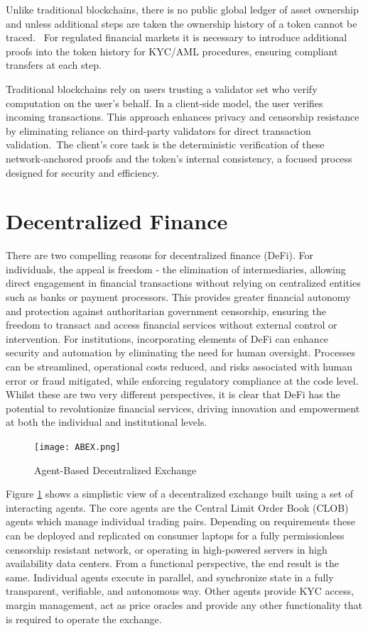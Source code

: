 \documentclass{article}
\begin{document}
Unlike traditional blockchains, there is no public global ledger of asset ownership and unless additional steps are taken the ownership history of a token cannot be traced.  For regulated financial markets it is necessary to introduce additional proofs into the token history for KYC/AML procedures, ensuring compliant transfers at each step.

Traditional blockchains rely on users trusting a validator set who verify computation on the user’s behalf. In a client-side model, the user verifies incoming transactions. This approach enhances privacy and censorship resistance by eliminating reliance on third-party validators for direct transaction validation. The client's core task is the deterministic verification of these network-anchored proofs and the token's internal consistency, a focused process designed for security and efficiency.

\section{Decentralized Finance}

There are two compelling reasons for decentralized finance (DeFi). For individuals, the appeal is freedom - the elimination of intermediaries, allowing direct engagement in financial transactions without relying on centralized entities such as banks or payment processors. This provides greater financial autonomy and protection against authoritarian government censorship, ensuring the freedom to transact and access financial services without external control or intervention. For institutions, incorporating elements of DeFi can enhance security and automation by eliminating the need for human oversight. Processes can be streamlined, operational costs reduced, and risks associated with human error or fraud mitigated, while enforcing regulatory compliance at the code level. Whilst these are two very different perspectives, it is clear that DeFi has the potential to revolutionize financial services, driving innovation and empowerment at both the individual and institutional levels.



\begin{figure}[H]
    \centering
    \texttt{[image: ABEX.png]}
    \caption{Agent-Based Decentralized Exchange}
    \label{fig:ABEX}
\end{figure}


Figure \ref{fig:ABEX} shows a simplistic view of a decentralized exchange built using a set of interacting agents. The core agents are the Central Limit Order Book (CLOB) agents which manage individual trading pairs. Depending on requirements these can be deployed and replicated on consumer laptops for a fully permissionless censorship resistant network, or operating in high-powered servers in high availability data centers. From a functional perspective, the end result is the same. Individual agents execute in parallel, and synchronize state in a fully transparent, verifiable, and autonomous way. Other agents provide KYC access, margin management, act as price oracles and provide any other functionality that is required to operate the exchange.
\end{document}
